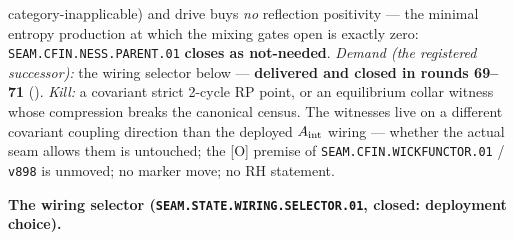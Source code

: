 \documentclass[11pt,a4paper]{article}
\begin{document}
{category-inapplicable) and drive buys \emph{no} reflection
positivity --- the minimal entropy production at which the
mixing gates open is exactly zero:
\texttt{SEAM.CFIN.NESS.PARENT.01} \textbf{closes as
not-needed}.  \emph{Demand (the registered successor):} the
wiring selector below --- \textbf{delivered and closed in
rounds 69--71} ().
\emph{Kill:} a covariant strict
2-cycle RP point, or an equilibrium collar witness whose
compression breaks the canonical census.  The witnesses live on
a different covariant coupling direction than the deployed
$A_{\rm int}$ wiring --- whether the actual seam allows them is
untouched; the [O] premise of
\texttt{SEAM.CFIN.WICKFUNCTOR.01} / \texttt{v898} is unmoved;
no marker move; no RH statement.\par}

\par\smallskip\noindent\textbf{The wiring selector
(\texttt{SEAM.STATE.WIRING.\allowbreak SELECTOR.01}, closed:
deployment choice).}
\end{document}
